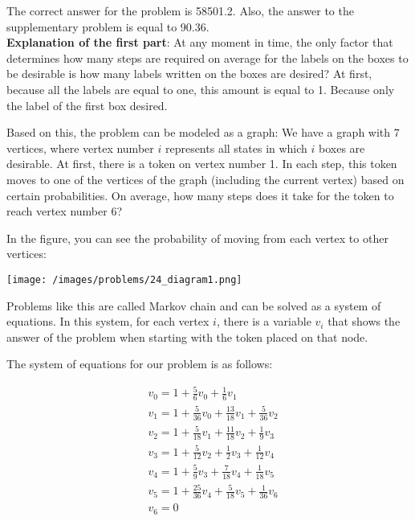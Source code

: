 \begin{solution}
The correct answer for the problem is 58501.2. Also, the answer to the supplementary problem is equal to 90.36.\\[0.2cm]

\textbf{Explanation of the first part}: At any moment in time, the only factor that determines how many steps are required on average for the labels on the boxes to be desirable is how many labels written on the boxes are desired? At first, because all the labels are equal to one, this amount is equal to 1. Because  only the label of the first box desired.

Based on this, the problem can be modeled as a graph:
We have a graph with 7 vertices, where vertex number $i$ represents all states in which $i$ boxes are desirable. At first, there is a token on vertex number  1. In each step, this token moves to one of the vertices of the graph (including the current vertex) based on certain probabilities. On average, how many steps does it take for the token to reach vertex number 6?

In the figure, you can see the probability of moving from each vertex to other vertices:

\begin{center}
	\texttt{[image: /images/problems/24\_diagram1.png]}
\end{center}

Problems like this are called Markov chain and can be solved as a system of equations. In this system, for each vertex $i$, there is a variable $v_i$ that shows the answer of the problem when starting with the token placed on that node.

The system of equations for our problem is as follows:

$$
\begin{aligned}
&v_0 = 1 + \frac{5}{6}v_0 + \frac{1}{6}v_1 \\
&v_1 = 1 + \frac{5}{36}v_0 + \frac{13}{18}v_1 + \frac{5}{36}v_2 \\
&v_2 = 1 + \frac{5}{18}v_1 + \frac{11}{18}v_2 + \frac{1}{9}v_3 \\
&v_3 = 1 + \frac{5}{12}v_2 + \frac{1}{2}v_3 + \frac{1}{12}v_4 \\
&v_4 = 1 + \frac{5}{9}v_3 + \frac{7}{18}v_4 + \frac{1}{18}v_5 \\
&v_5 = 1 + \frac{25}{36}v_4 + \frac{5}{18}v_5 + \frac{1}{36}v_6 \\
&v_6 = 0
\end{aligned}
$$


\end{solution}
